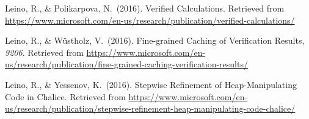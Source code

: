\documentclass[12pt,twoside]{article}
\begin{document}
{\begin{thebibliography}{1079}
\mdbibitemlabel{}Leino, R., \& Polikarpova, N.~(2016). Verified Calculations. Retrieved from \href{https://www.microsoft.com/en-us/research/publication/verified-calculations/}{{\ttfamily https://\hspace{0pt}www.\hspace{0pt}microsoft.\hspace{0pt}com/\hspace{0pt}en-\hspace{0pt}us/\hspace{0pt}research/\hspace{0pt}publication/\hspace{0pt}verified-\hspace{0pt}calculations/\hspace{0pt}}}%

\mdbibitemlabel{}Leino, R., \& Wüstholz, V.~(2016). Fine-grained Caching of Verification Results, \emph{9206}. Retrieved from \href{https://www.microsoft.com/en-us/research/publication/fine-grained-caching-verification-results/}{{\ttfamily https://\hspace{0pt}www.\hspace{0pt}microsoft.\hspace{0pt}com/\hspace{0pt}en-\hspace{0pt}us/\hspace{0pt}research/\hspace{0pt}publication/\hspace{0pt}fine-\hspace{0pt}grained-\hspace{0pt}caching-\hspace{0pt}verification-\hspace{0pt}results/\hspace{0pt}}}%

\mdbibitemlabel{}Leino, R., \& Yessenov, K.~(2016). Stepwise Refinement of Heap-Manipulating Code in Chalice. Retrieved from \href{https://www.microsoft.com/en-us/research/publication/stepwise-refinement-heap-manipulating-code-chalice/}{{\ttfamily https://\hspace{0pt}www.\hspace{0pt}microsoft.\hspace{0pt}com/\hspace{0pt}en-\hspace{0pt}us/\hspace{0pt}research/\hspace{0pt}publication/\hspace{0pt}stepwise-\hspace{0pt}refinement-\hspace{0pt}heap-\hspace{0pt}manipulating-\hspace{0pt}code-\hspace{0pt}chalice/\hspace{0pt}}}%


\end{thebibliography}}
\end{document}
